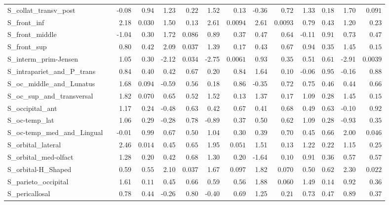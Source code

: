 {\begin{longtable}{llrrrrrrrrrrrr}
S\_collat\_transv\_post &  & -0.08 & $0.94$ & 1.23 & $0.22$ & 1.52 & $0.13$ & -0.36 & $0.72$ & 1.33 & $0.18$ & 1.70 & $0.091$ \\
S\_front\_inf &  & 2.18 & $0.030$ & 1.50 & $0.13$ & 2.61 & $0.0094$ & 2.61 & $0.0093$ & 0.79 & $0.43$ & 1.20 & $0.23$ \\
S\_front\_middle &  & -1.04 & $0.30$ & 1.72 & $0.086$ & 0.89 & $0.37$ & 0.47 & $0.64$ & -0.11 & $0.91$ & 0.73 & $0.47$ \\
S\_front\_sup &  & 0.80 & $0.42$ & 2.09 & $0.037$ & 1.39 & $0.17$ & 0.43 & $0.67$ & 0.94 & $0.35$ & 1.45 & $0.15$ \\
S\_interm\_prim-Jensen &  & 1.05 & $0.30$ & -2.12 & $0.034$ & -2.75 & $0.0061$ & 0.93 & $0.35$ & 0.51 & $0.61$ & -2.91 & $0.0039$ \\
S\_intrapariet\_and\_P\_trans &  & 0.84 & $0.40$ & 0.42 & $0.67$ & 0.20 & $0.84$ & 1.64 & $0.10$ & -0.06 & $0.95$ & -0.16 & $0.88$ \\
S\_oc\_middle\_and\_Lunatus &  & 1.68 & $0.094$ & -0.59 & $0.56$ & 0.18 & $0.86$ & -0.35 & $0.72$ & 0.75 & $0.46$ & 0.44 & $0.66$ \\
S\_oc\_sup\_and\_transversal &  & 1.82 & $0.070$ & 0.65 & $0.52$ & 1.52 & $0.13$ & 1.37 & $0.17$ & 1.09 & $0.28$ & 1.45 & $0.15$ \\
S\_occipital\_ant &  & 1.17 & $0.24$ & -0.48 & $0.63$ & 0.42 & $0.67$ & 0.41 & $0.68$ & 0.49 & $0.63$ & -0.10 & $0.92$ \\
S\_oc-temp\_lat &  & 1.06 & $0.29$ & -0.28 & $0.78$ & -0.89 & $0.37$ & 0.50 & $0.62$ & 1.09 & $0.28$ & -0.93 & $0.35$ \\
S\_oc-temp\_med\_and\_Lingual &  & -0.01 & $0.99$ & 0.67 & $0.50$ & 1.04 & $0.30$ & 0.39 & $0.70$ & 0.45 & $0.66$ & 2.00 & $0.046$ \\
S\_orbital\_lateral &  & 2.46 & $0.014$ & 0.45 & $0.65$ & 1.95 & $0.051$ & 1.51 & $0.13$ & 1.22 & $0.22$ & 1.15 & $0.25$ \\
S\_orbital\_med-olfact &  & 1.28 & $0.20$ & 0.42 & $0.68$ & 1.30 & $0.20$ & -1.64 & $0.10$ & 0.91 & $0.36$ & 0.57 & $0.57$ \\
S\_orbital-H\_Shaped &  & 0.59 & $0.55$ & 2.10 & $0.037$ & 1.67 & $0.097$ & 1.82 & $0.070$ & 0.50 & $0.62$ & 2.30 & $0.022$ \\
S\_parieto\_occipital &  & 1.61 & $0.11$ & 0.45 & $0.66$ & 0.59 & $0.56$ & 1.88 & $0.060$ & 1.49 & $0.14$ & 0.92 & $0.36$ \\
S\_pericallosal &  & 0.78 & $0.44$ & -0.26 & $0.80$ & -0.40 & $0.69$ & 1.25 & $0.21$ & 0.73 & $0.47$ & 0.89 & $0.37$ \\

\end{longtable}}
